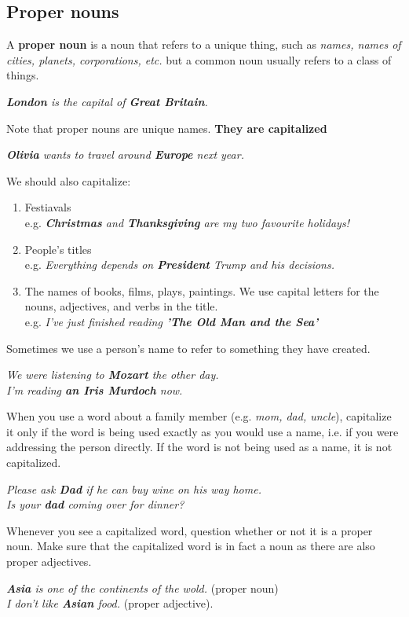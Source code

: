 \documentclass[10pt,a4paper]{article}
\begin{document}
\subsection{Proper nouns}
A \textbf{proper noun} is a noun that refers to a unique thing, such as \textit{names, names of cities, planets, corporations, etc.} but a common noun usually refers to a class of things.
\begin{center}
		\textit{\textbf{London} is the capital of \textbf{Great Britain}.}
\end{center}
Note that proper nouns are unique names. \textbf{They are capitalized}
\begin{center}
\textit{\textbf{Olivia} wants to travel around \textbf{Europe} next year.}
\end{center}
We should also capitalize:
\begin{enumerate}[label=\alph*)]
		\item Festiavals\\
				e.g. \textit{\textbf{Christmas} and \textbf{Thanksgiving} are my two favourite holidays!}
		\item People's titles\\
				e.g. \textit{Everything depends on \textbf{President} Trump and his decisions.}
		\item The names of books, films, plays, paintings. We use capital letters for the nouns, adjectives, and verbs in the title.\\
				e.g. \textit{I've just finished reading \textbf{'The Old Man and the Sea'}}
\end{enumerate}
Sometimes we use a person's name to refer to something they have created.
\begin{center}
\textit{We were listening to \textbf{Mozart} the other day.}\\
\textit{I'm reading \textbf{an Iris Murdoch} now.}
\end{center}

When you use a word about a family member (e.g. \textit{mom, dad, uncle}), capitalize it only if the word is being used exactly as you would use a name, i.e. if you were addressing the person directly. If the word is not being used as a name, it is not capitalized.
\begin{center}
		\textit{Please ask \textbf{Dad} if he can buy wine on his way home.}\\
		\textit{Is your \textbf{dad} coming over for dinner?}
\end{center}
Whenever you see a capitalized word, question whether or not it is a proper noun. Make sure that the capitalized word is in fact a noun as there are also proper adjectives.
\begin{center}
		\textit{ \textbf{Asia} is one of the continents of the wold.} (proper noun)\\
		\textit{I don't like \textbf{Asian} food.} (proper adjective).
\end{center}
\end{document}
